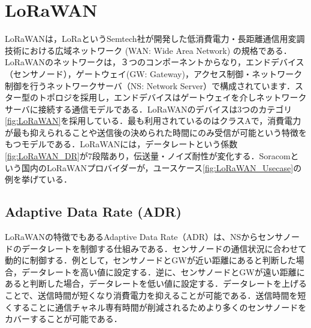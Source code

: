 \section{LoRaWAN}
LoRaWANは，LoRaというSemtech社が開発した低消費電力・長距離通信用変調技術における広域ネットワーク (WAN: Wide Area Network) の規格である．LoRaWANのネットワークは，３つのコンポーネントからなり，エンドデバイス（センサノード），ゲートウェイ(GW: Gateway)，アクセス制御・ネットワーク制御を行うネットワークサーバ（NS: Network Server）で構成されています．スター型のトポロジを採用し，エンドデバイスはゲートウェイを介しネットワークサーバに接続する通信モデルである．LoRaWANのデバイスは3つのカテゴリ\ref{fig:LoRaWAN}を採用している．最も利用されているのはクラスAで，消費電力が最も抑えられることや送信後の決められた時間にのみ受信が可能という特徴をもつモデルである．LoRaWANには，データレートという係数\ref{fig:LoRaWAN_DR}が7段階あり，伝送量・ノイズ耐性が変化する．Soracomという国内のLoRaWANプロバイダーが，ユースケース\ref{fig:LoRaWAN_Usecase}の例を挙げている．

\subsection{Adaptive Data Rate (ADR)}
LoRaWANの特徴でもあるAdaptive Data Rate（ADR）は、NSからセンサノードのデータレートを制御する仕組みである．センサノードの通信状況に合わせて動的に制御する．例として，センサノードとGWが近い距離にあると判断した場合，データレートを高い値に設定する．逆に、センサノードとGWが遠い距離にあると判断した場合，データレートを低い値に設定する．データレートを上げることで、送信時間が短くなり消費電力を抑えることが可能である．送信時間を短くすることに通信チャネル専有時間が削減されるためより多くのセンサノードをカバーすることが可能である．

